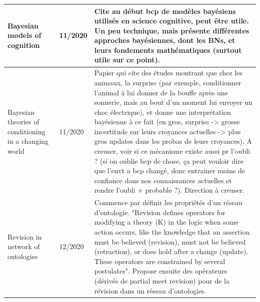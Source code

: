 \documentclass[french]{article}
\begin{document}
\begin{table}[ht!]
\begin{center}
\begin{tabular}{|p{}|p{}|p{}|}
            \\
            \hline
            Bayesian models of cognition \cite{l_griffiths_bayesian_2008}
            & 11/2020
            & Cite au début bcp de modèles bayésiens utilisés en science cognitive, peut être utile. Un peu technique, mais présente différentes approches bayésiennes, dont les BNs, et leurs fondements mathématiques (surtout utile sur ce point).
            \\
            \hline
            Bayesian theories of conditioning in a changing world \cite{courville_bayesian_2006}
            & 11/2020
            & Papier qui cite des études montrant que chez les animaux, la surprise (par exemple, conditionner l'animal à lui donner de la bouffe après une sonnerie, mais au bout d'un moment lui envoyer un choc électrique), et donne une interprétation bayésienne à ce fait (en gros, surprise -> grosse incertitude sur leurs croyances actuelles -> plus gros updates dans les probas de leurs croyances). A creuser, voir si ce mécanisme existe aussi pr l'oubli ? (si on oublie bcp de chose, ça peut vouloir dire que l'envt a bcp changé, donc entrainer moins de confiance dans nos connaissances actuelles et rendre l'oubli + probable ?). Direction à creuser.
            \\
            \hline

            Revision in network of ontologies \cite{euzenat_revision_2015}
            & 12/2020
            & Commence par définir les propriétés d'un réseau d'ontologie. "Revision defines operators for modifying a theory (K) in the logic when some action occurs, like the knowledge that an assertion must be believed (revision), must not be believed (retraction), or does hold after a change (update). These operators are constrained by several postulates". Propose ensuite des opérateurs (dérivés de partial meet revision) pour de la révision dans un réseau d'ontologies.

            \\
            \hline
        \end{tabular}
    \end{center}
    \end{table}
    \newpage
\end{document}
